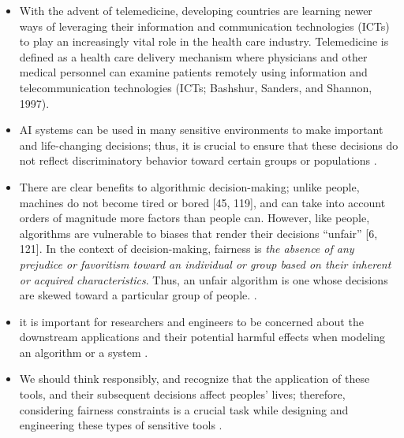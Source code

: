 \documentclass[12pt, a4paper, oneside]{book}   	%
\renewcommand{\todo}[1]{\textcolor{red}{TODO: #1}}
\newif\ifrawcitationactive
\newcommand{\rawcitationstart}{
	\color{purple}\rawcitationactivetrue
}
\newcommand{\rawcitationend}{
	\color{black}\rawcitationactivefalse
}
\newcommand{\rawcitationusedstart}{\color{violet}}
\newcommand{\rawcitationusedend}{%
	\ifrawcitationactive
	\color{purple}  %
	\else
	\color{black}  %
	\fi
}
\begin{document}
		
		
		

		
	    \rawcitationstart
		\begin{itemize}
			\item With the advent of telemedicine, developing countries are learning newer ways of leveraging their information and communication technologies (ICTs) to play an increasingly
			vital role in the health care industry. Telemedicine is defined as a health care delivery mechanism where physicians and other medical personnel can examine patients remotely
			using information and telecommunication technologies (ICTs; Bashshur, Sanders, and Shannon, 1997). \autocite{Kifle_2024}
			\rawcitationusedstart
			\item AI systems can be used in many sensitive environments to make important and life-changing decisions; thus, it is crucial to ensure that these decisions do not reflect discriminatory behavior toward certain groups or populations \autocite{Mehrabi_2021}.
			\rawcitationusedend
			\item There are clear benefits to algorithmic decision-making; unlike people, machines do not become tired or bored [45, 119], and can take into account orders of magnitude more factors than people can. However, like people, algorithms are vulnerable to biases that render their decisions “unfair” [6, 121]. In the context of decision-making, fairness is \textit{the absence of any prejudice or favoritism toward an individual or group based on their inherent or acquired characteristics}. Thus, an unfair algorithm is one whose decisions are skewed toward a particular group of people. \autocite{Mehrabi_2021}.
			\item it is important for researchers and engineers to be concerned about the downstream applications and their potential harmful effects when modeling an algorithm or a system \autocite{Mehrabi_2021}.
			\item We should think responsibly, and recognize that the application of these tools, and their subsequent decisions affect peoples’ lives; therefore, considering fairness constraints is a crucial task while designing and engineering these types of sensitive tools \autocite{Mehrabi_2021}.
		\end{itemize}
		\rawcitationend
	
\end{document}
